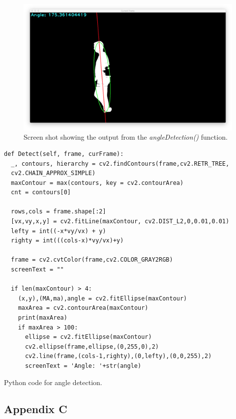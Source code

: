 \documentclass[11pt,a4paper]{report}
\begin{document}
\begin{figure}[H]
 \centering
 \includegraphics[scale = 0.22]{angleExample.png}
 \caption{Screen shot showing the output from the \textit{angleDetection()} function.}
 \label{fig:angleDetectionExample}
\end{figure}

\begin{listing}
\begin{verbatim}
def Detect(self, frame, curFrame):
  _, contours, hierarchy = cv2.findContours(frame,cv2.RETR_TREE,
  cv2.CHAIN_APPROX_SIMPLE)
  maxContour = max(contours, key = cv2.contourArea)
  cnt = contours[0]

  rows,cols = frame.shape[:2]
  [vx,vy,x,y] = cv2.fitLine(maxContour, cv2.DIST_L2,0,0.01,0.01)
  lefty = int((-x*vy/vx) + y)
  righty = int(((cols-x)*vy/vx)+y)

  frame = cv2.cvtColor(frame,cv2.COLOR_GRAY2RGB)
  screenText = ""

  if len(maxContour) > 4:
    (x,y),(MA,ma),angle = cv2.fitEllipse(maxContour)
    maxArea = cv2.contourArea(maxContour)
    print(maxArea)
    if maxArea > 100:
      ellipse = cv2.fitEllipse(maxContour)
      cv2.ellipse(frame,ellipse,(0,255,0),2)
      cv2.line(frame,(cols-1,righty),(0,lefty),(0,0,255),2)
      screenText = 'Angle: '+str(angle)
\end{verbatim}
\caption{Python code for angle detection.}
\label{angleDetectionPython}
\end{listing}

\subsection{Appendix C}
\end{document}
